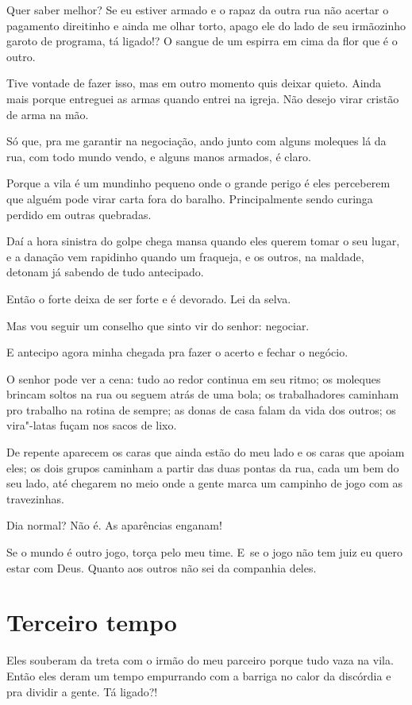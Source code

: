 Quer saber melhor? Se eu estiver armado e o rapaz da outra rua não
acertar o pagamento direitinho e ainda me olhar torto, apago ele do lado
de seu irmãozinho garoto de programa, tá ligado!? O sangue de um espirra
em cima da flor que é o outro.

Tive vontade de fazer isso, mas em outro momento quis deixar quieto.
Ainda mais porque entreguei as armas quando entrei na igreja. Não desejo
virar cristão de arma na mão.

Só que, pra me garantir na negociação, ando junto com alguns moleques lá
da rua, com todo mundo vendo, e alguns manos armados, é claro.

Porque a vila é um mundinho pequeno onde o grande perigo é eles
perceberem que alguém pode virar carta fora do baralho. Principalmente
sendo curinga perdido em outras quebradas.

Daí a hora sinistra do golpe chega mansa quando eles querem tomar o seu
lugar, e a danação vem rapidinho quando um fraqueja, e os outros, na
maldade, detonam já sabendo de tudo antecipado.

Então o forte deixa de ser forte e é devorado. Lei da selva.

Mas vou seguir um conselho que sinto vir do senhor: negociar.

E antecipo agora minha chegada pra fazer o acerto e fechar o negócio.

O senhor pode ver a cena: tudo ao redor continua em seu ritmo; os
moleques brincam soltos na rua ou seguem atrás de uma bola; os
trabalhadores caminham pro trabalho na rotina de sempre; as donas de
casa falam da vida dos outros; os vira"-latas fuçam nos sacos de lixo.

De repente aparecem os caras que ainda estão do meu lado e os caras que
apoiam eles; os dois grupos caminham a partir das duas pontas da rua,
cada um bem do seu lado, até chegarem no meio onde a gente marca um
campinho de jogo com as travezinhas.

Dia normal? Não é. As aparências enganam!

Se o mundo é outro jogo, torça pelo meu time. E~se o jogo não tem juiz
eu quero estar com Deus. Quanto aos outros não sei da companhia deles.

\section{Terceiro tempo}

Eles souberam da treta com o irmão do meu parceiro porque tudo vaza na
vila. Então eles deram um tempo empurrando com a barriga no calor da
discórdia e pra dividir a gente. Tá ligado?!

